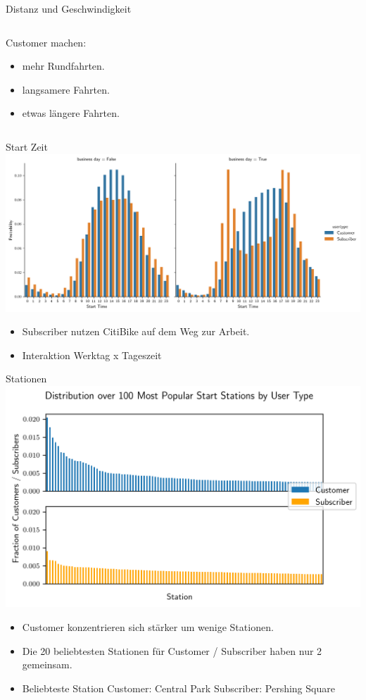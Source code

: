 \begin{frame}{Distanz und Geschwindigkeit}
\begin{columns}
\begin{column}{0.5\linewidth }
{
Customer machen:
\begin{itemize}
\item mehr Rundfahrten.
\item langsamere Fahrten.
\item etwas längere Fahrten.
\end{itemize}
}
\end{column}
\end{columns}
\end{frame}

\begin{frame}{Start Zeit}
\centering
\includegraphics[height=0.6\textheight]{../Images/StartTimeByBusiness}
{
\begin{itemize}
\item Subscriber nutzen CitiBike auf dem Weg zur Arbeit.
\item Interaktion Werktag x Tageszeit
\end{itemize}
}
\end{frame}

\begin{frame}{Stationen}
\centering
\includegraphics[height=0.6\textheight]{../Images/StartStationPopularity}
{
\begin{itemize}
\item Customer konzentrieren sich stärker um wenige Stationen.
\item Die 20 beliebtesten Stationen für Customer / Subscriber haben nur 2 gemeinsam.
\item Beliebteste Station Customer: Central Park \hspace{1cm} Subscriber: Pershing Square
\end{itemize}
}
\end{frame}

